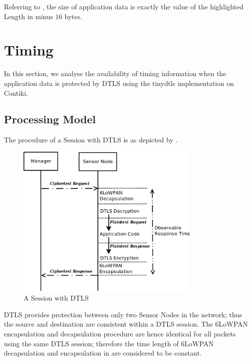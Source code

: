 Referring to \cite{rfc5116}, the size of application data is exactly the value of the highlighted Length in  minus $16$ bytes.


\section{Timing}

In this section, we analyse the availability of timing information when the application data is protected by DTLS using the tinydtls implementation on Contiki.

\subsection{Processing Model}

The procedure of a Session with DTLS is as depicted by .

\begin{figure}[ht!]
	\center
	\includegraphics[width=0.8\textwidth]{fig/dtls_session.png}
	\caption{A Session with DTLS}
	\label{Fig: A Session with DTLS}
\end{figure}

DTLS provides protection between only two Sensor Nodes in the network; thus the source and destination are consistent within a DTLS session. The 6LoWPAN encapsulation and decapsulation procedure are hence identical for all packets using the same DTLS session; therefore the time length of 6LoWPAN decapsulation and encapsulation in  are considered to be constant.

